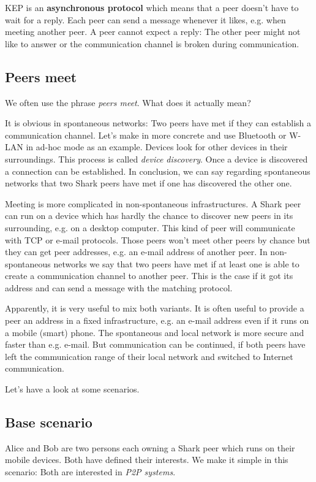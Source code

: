 KEP is an {\bf asynchronous protocol} which means that a peer doesn't have to wait for a reply. Each peer can send a message whenever it likes, e.g. when meeting another peer. A peer cannot expect a reply: The other peer might not like to answer or the communication channel is broken during communication.

\subsection{Peers meet}
We often use the phrase {\it peers meet}. What does it actually mean?

It is obvious in spontaneous networks: Two peers have met if they can establish a communication channel. Let's make in more concrete and use Bluetooth or W-LAN in ad-hoc mode as an example. Devices look for other devices in their surroundings.
This process is called {\it device discovery}. Once a device is discovered a connection can be established. In conclusion, we can say regarding spontaneous networks that two Shark peers have met if one has discovered the other one.

Meeting is more complicated in non-spontaneous infrastructures. A Shark peer can run on a device which has hardly the chance to discover new peers in its surrounding, e.g. on a desktop computer. This kind of peer will communicate with TCP or e-mail protocols. Those peers won't meet other peers by chance but they can get peer addresses, e.g. an e-mail address of another peer. In non-spontaneous networks we say that two peers have met if at least one is able to create a communication channel to another peer. This is the case if it got its address and can send a message with the matching protocol.

Apparently, it is very useful to mix both variants. It is often useful to provide a peer an address in a fixed infrastructure, e.g. an e-mail address even if it runs on a mobile (smart) phone. The spontaneous and local network is more secure and faster than e.g. e-mail. But communication can be continued, if both peers have left the communication range of their local network and switched to Internet communication.

Let's have a look at some scenarios.

\subsection{Base scenario}
\label{sec:concepts:baseScenario}
Alice and Bob are two persons each owning a Shark peer which runs on their mobile devices. Both have defined their interests. We make it simple in this scenario:
Both are interested in {\it P2P systems}. 

